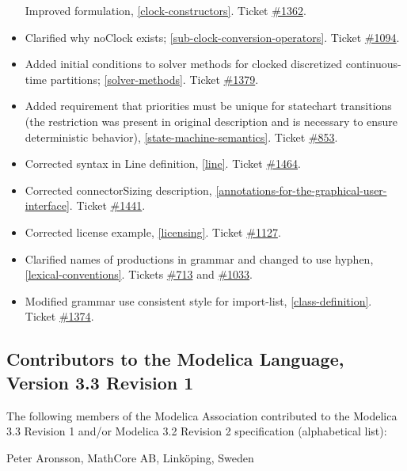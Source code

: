 \documentclass[10pt,a4paper]{report}
\def\doublelabel#1{\label{#1}\hypertarget{#1}{}}
\begin{document}
\begin{itemize}
  Improved formulation, \ref{clock-constructors}. Ticket
  \href{https://trac.modelica.org/Modelica/ticket/1362}{\#1362}.
\item
  Clarified why noClock exists; \ref{sub-clock-conversion-operators}. Ticket
  \href{https://trac.modelica.org/Modelica/ticket/1094}{\#1094}.
\item
  Added initial conditions to solver methods for clocked discretized
  continuous-time partitions; \ref{solver-methods}. Ticket
  \href{https://trac.modelica.org/Modelica/ticket/1379}{\#1379}.
\item
  Added requirement that priorities must be unique for statechart
  transitions (the restriction was present in original description and
  is necessary to ensure deterministic behavior), \ref{state-machine-semantics}. Ticket
  \href{https://trac.modelica.org/Modelica/ticket/853}{\#853}.
\item
  Corrected syntax in Line definition, \ref{line}. Ticket
  \href{https://trac.modelica.org/Modelica/ticket/1464}{\#1464}.
\item
  Corrected connectorSizing description, \ref{annotations-for-the-graphical-user-interface}. Ticket
  \href{https://trac.modelica.org/Modelica/ticket/1441}{\#1441}.
\item
  Corrected license example, \ref{licensing}. Ticket
  \href{https://trac.modelica.org/Modelica/ticket/1127}{\#1127}.
\item
  Clarified names of productions in grammar and changed to use hyphen,
  \ref{lexical-conventions}. Tickets
  \href{https://trac.modelica.org/Modelica/ticket/713}{\#713} and
  \href{https://trac.modelica.org/Modelica/ticket/1033}{\#1033}.
\item
  Modified grammar use consistent style for import-list, \ref{class-definition}.
  Ticket \href{https://trac.modelica.org/Modelica/ticket/1374}{\#1374}.
\end{itemize}

\subsection{Contributors to the Modelica Language, Version 3.3 Revision 1}\doublelabel{contributors-to-the-modelica-language-version-3-3-revision-1}

The following members of the Modelica Association contributed to the
Modelica 3.3 Revision 1 and/or Modelica 3.2 Revision 2 specification
(alphabetical list):

Peter Aronsson, MathCore AB, Linköping, Sweden
\end{document}
